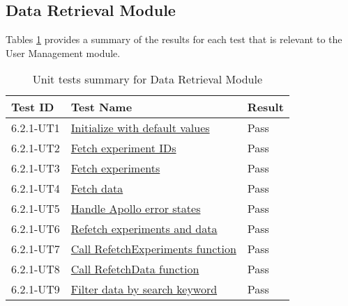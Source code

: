 \documentclass[12pt, titlepage]{article}
\begin{document}
\subsection{Data Retrieval Module}
Tables \ref{UT:DataRetrieval} provides a summary of the results for each test that is
relevant to the User Management module.
\begin{table}[H]
  \centering
  \begin{tabular}{|l|l|l|}
    \hline
    \textbf{Test ID} & \textbf{Test Name} & \textbf{Result}\\
    \hline
    6.2.1-UT1 & \href{https://github.com/SumanyaG/Alkalytics/blob/main/src/frontend/test/hooks/useTable.test.tsx}{Initialize with default values} & Pass \\
    \hline
    6.2.1-UT2 & \href{https://github.com/SumanyaG/Alkalytics/blob/main/src/frontend/test/hooks/useTable.test.tsx}{Fetch experiment IDs} & Pass \\
    \hline
    6.2.1-UT3 & \href{https://github.com/SumanyaG/Alkalytics/blob/main/src/frontend/test/hooks/useTable.test.tsx}{Fetch experiments} & Pass \\
    \hline
    6.2.1-UT4 & \href{https://github.com/SumanyaG/Alkalytics/blob/main/src/frontend/test/hooks/useTable.test.tsx}{Fetch data} & Pass \\
    \hline
    6.2.1-UT5 & \href{https://github.com/SumanyaG/Alkalytics/blob/main/src/frontend/test/hooks/useTable.test.tsx}{Handle Apollo error states} & Pass \\
    \hline
    6.2.1-UT6 & \href{https://github.com/SumanyaG/Alkalytics/blob/main/src/frontend/test/hooks/useTable.test.tsx}{Refetch experiments and data} & Pass \\
    \hline
    6.2.1-UT7 & \href{https://github.com/SumanyaG/Alkalytics/blob/main/src/frontend/test/hooks/useTable.test.tsx}{Call RefetchExperiments function} & Pass \\
    \hline
    6.2.1-UT8 & \href{https://github.com/SumanyaG/Alkalytics/blob/main/src/frontend/test/hooks/useTable.test.tsx}{Call RefetchData function} & Pass \\
    \hline
    6.2.1-UT9 & \href{https://github.com/SumanyaG/Alkalytics/blob/main/src/frontend/test/hooks/TableHeader.test.tsx}{Filter data by search keyword} & Pass \\
    \hline
  \end{tabular}
  \caption{Unit tests summary for Data Retrieval Module}
  \label{UT:DataRetrieval}
\end{table}
\end{document}

